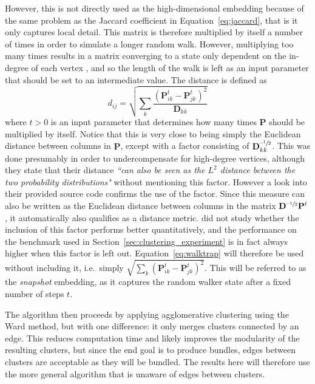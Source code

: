 However, this is not directly used as the high-dimensional embedding because of the same problem as the Jaccard coefficient in Equation~\eqref{eq:jaccard}, that is it only captures local detail. This matrix is therefore multiplied by itself a number of times in order to simulate a longer random walk. However, multiplying too many times results in a matrix converging to a state only dependent on the in-degree of each vertex \citep{Pons2006}, and so the length of the walk is left as an input parameter that should be set to an intermediate value.
The distance is defined as
\begin{equation}
  d_{ij} = \sqrt{\sum_{k}\frac{(\mathbf{P}_{ik}^t - \mathbf{P}_{jk}^t)^2}{\mathbf{D}_{kk}}}
  \label{eq:walktrap}
\end{equation}
where $t>0$ is an input parameter that determines how many times $\mathbf{P}$ should be multiplied by itself.
Notice that this is very close to being simply the Euclidean distance between columns in $\mathbf{P}$, except with a factor consisting of $\mathbf{D}_{kk}^{\text{--}\sfrac{1}{2}}$. This was done presumably in order to undercompensate for high-degree vertices, although they state that their distance \textit{``can also be seen as the $L^2$ distance between the two probability distributions"} \citep{Pons2006} without mentioning this factor. However a look into their provided source code confirms the use of the factor.
Since this measure can also be written as the Euclidean distance between columns in the matrix $\mathbf{D}^{\text{--}\sfrac{1}{2}}\mathbf{P}^t$, it automatically also qualifies as a distance metric.
\citet{Pons2006} did not study whether the inclusion of this factor performs better quantitatively, and the performance on the benchmark used in Section~\ref{sec:clustering_experiment} is in fact always higher when this factor is left out. Equation~\eqref{eq:walktrap} will therefore be used without including it, i.e.\ simply $\sqrt{\sum_{k}(\mathbf{P}_{ik}^t - \mathbf{P}_{jk}^t)^2}$. This will be referred to as the \emph{snapshot} embedding, as it captures the random walker state after a fixed number of steps $t$.

The algorithm then proceeds by applying agglomerative clustering using the Ward method, but with one difference: it only merges clusters connected by an edge. This reduces computation time and likely improves the modularity of the resulting clusters, but since the end goal is to produce bundles, edges between clusters are acceptable as they will be bundled. The results here will therefore use the more general algorithm that is unaware of edges between clusters.

